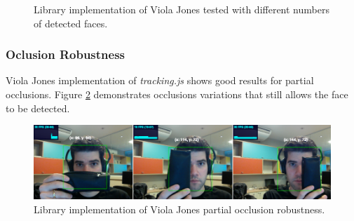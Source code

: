 \begin{figure}[!htb]
  \centering
   \caption{Library implementation of Viola Jones tested with different numbers of detected faces.}
   \label{figure:viola_fps}
\end{figure}


\subsubsection{Oclusion Robustness} %
\label{subsub:evaluation:results:rapid_object_detection:occlusion_robustness}

Viola Jones implementation of \textit{tracking.js} shows good results for partial occlusions. Figure \ref{figure:viola_occlusion} demonstrates occlusions variations that still allows the face to be detected.

\begin{figure}[!htb]
  \centering
  \includegraphics[width=\linewidth]{chapters/evaluation/viola_occlusion.png}
  \caption{Library implementation of Viola Jones partial occlusion robustness.}
  \label{figure:viola_occlusion}
\end{figure}

